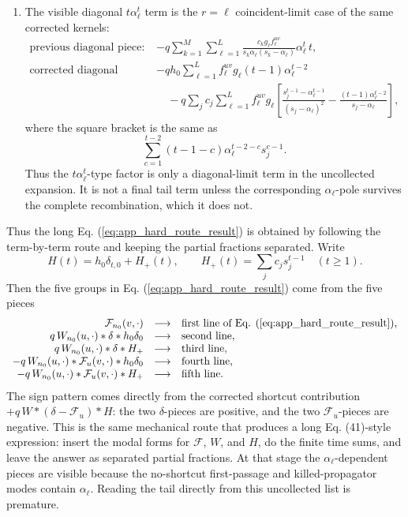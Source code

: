 \documentclass[superscriptaddress, amsmath, amssymb, aps, pre, floatfix]{revtex4-2}
\begin{document}
\begin{enumerate}
\item The visible diagonal \(t\alpha_\ell^t\) term is the \(r=\ell\) coincident-limit case of the same corrected kernels:
\begin{align*}
\text{previous diagonal piece:}\qquad
&-q\sum_{k=1}^{M}\sum_{\ell=1}^{L}
\frac{c_kg_\ell f_\ell^{uv}}{s_k\alpha_\ell(s_k-\alpha_\ell)}
\alpha_\ell^t\,t,
\nonumber\\
\text{corrected diagonal pieces:}\qquad
&-q h_0\sum_{\ell=1}^{L}
f_\ell^{uv}g_\ell(t-1)\alpha_\ell^{t-2}
\nonumber\\
&\quad
-q\sum_j c_j\sum_{\ell=1}^{L}
f_\ell^{uv}g_\ell
\left[
\frac{s_j^{t-1}-\alpha_\ell^{t-1}}{(s_j-\alpha_\ell)^2}
-\frac{(t-1)\alpha_\ell^{t-2}}{s_j-\alpha_\ell}
\right],
\end{align*}
where the square bracket is the same as
\[
  \sum_{c=1}^{t-2}(t-1-c)\alpha_\ell^{t-2-c}s_j^{c-1}.
\]
Thus the \(t\alpha_\ell^t\)-type factor is only a diagonal-limit term in the uncollected expansion.  It is not a final tail term unless the corresponding \(\alpha_\ell\)-pole survives the complete recombination, which it does not.
\end{enumerate}

Thus the long Eq. (\ref{eq:app_hard_route_result}) is obtained by following the term-by-term route and keeping the partial fractions separated.  Write
\[
  H(t)=h_0\delta_{t,0}+H_+(t),
  \qquad
  H_+(t)=\sum_j c_j s_j^{t-1}\quad (t\geq1).
\]
Then the five groups in Eq. (\ref{eq:app_hard_route_result}) come from the five pieces
\[
\begin{array}{rcl}
\mathcal F_{n_0}(v,\cdot) &\longrightarrow& \text{first line of Eq. (\ref{eq:app_hard_route_result})},\\
q\,W_{n_0}(u,\cdot)*\delta* h_0\delta_0
&\longrightarrow& \text{second line},\\
q\,W_{n_0}(u,\cdot)*\delta*H_+
&\longrightarrow& \text{third line},\\
-q\,W_{n_0}(u,\cdot)*\mathcal F_u(v,\cdot)*h_0\delta_0
&\longrightarrow& \text{fourth line},\\
-q\,W_{n_0}(u,\cdot)*\mathcal F_u(v,\cdot)*H_+
&\longrightarrow& \text{fifth line}.
\end{array}
\]
The sign pattern comes directly from the corrected shortcut contribution \(+q\,W*(\delta-\mathcal F_u)*H\): the two \(\delta\)-pieces are positive, and the two \(\mathcal F_u\)-pieces are negative.
This is the same mechanical route that produces a long Eq. (41)-style expression: insert the modal forms for \(\mathcal F\), \(W\), and \(H\), do the finite time sums, and leave the answer as separated partial fractions.  At that stage the \(\alpha_\ell\)-dependent pieces are visible because the no-shortcut first-passage and killed-propagator modes contain \(\alpha_\ell\).  Reading the tail directly from this uncollected list is premature.
\end{document}

